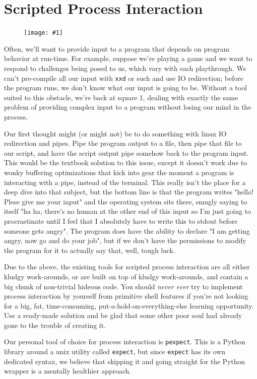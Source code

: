 \documentclass{article}
\newcommand{\wrapimageright}[1] {
    \begin{figure}
        \begin{center}
            \texttt{[image: \#1]} 
        \end{center}
    \end{figure}
}
\newcommand{\xcode}[2]{\colorbox{ubuntuback}{\lstinline[language=#1]|#2|}}
\begin{document}
\section{Scripted Process Interaction}

\wrapimageright{./images/robot_laptop.jpg}
Often, we'll want to provide input to a program that depends on program behavior at run-time. For example, suppose we're playing a game and we want to respond to challenges being posed to us, which vary with each playthrough. We can't pre-compile all our input with \xcode{bash}{xxd} or such and use IO redirection; before the program runs, we don't know what our input is going to be. Without a tool suited to this obstacle, we're back at square 1, dealing with exactly the same problem of providing complex input to a program without losing our mind in the process.

Our first thought might (or might not) be to do something with linux IO redirection and pipes. Pipe the program output to a file, then pipe that file to our script, and have the script output pipe somehow back to the program input. This would be the textbook solution to this issue, except it doesn't work due to wonky buffering optimizations that kick into gear the moment a program is interacting with a pipe, instead of the terminal. This really isn't the place for a deep dive into that subject, but the bottom line is that the program writes "hello! Plese give me your input" and the operating system sits there, smugly saying to itself "ha ha, there's no human at the other end of this input so I'm just going to procrastinate until I feel that I absolutely have to write this to stdout before someone gets angry". The program does have the ability to declare "I am getting angry, now go and do your job", but if we don't have the permissions to modify the program for it to actually say that, well, tough luck.

Due to the above, the existing tools for scripted process interaction are all either kludgy work-arounds, or are built on top of kludgy work-arounds, and contain a big chunk of non-trivial hideous code. You should \textit{never ever} try to implement process interaction by yourself from primitive shell features if you're not looking for a big, fat, time-consuming, put-a-hold-on-everything-else learning opportunity. Use a ready-made solution and be glad that some other poor soul had already gone to the trouble of creating it.

Our personal tool of choice for process interaction is \xcode{python}{pexpect}. This is a Python library around a unix utility called \xcode{bash}{expect}, but since \xcode{bash}{expect} has its own dedicated syntax, we believe that skipping it and going straight for the Python wrapper is a mentally healthier approach.
\end{document}
